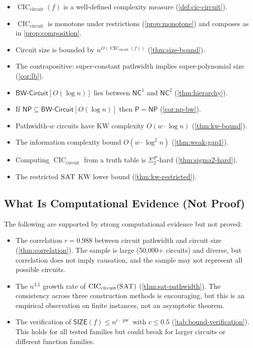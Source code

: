 \documentclass[11pt]{article}
\theoremstyle{plain}
\theoremstyle{definition}
\newcommand{\pw}{\operatorname{pw}}
\newcommand{\CIC}{\operatorname{CIC}}
\newcommand{\CICcirc}{\CIC_{\text{circuit}}}
\newcommand{\SAT}{\textsc{SAT}}
\newcommand{\SIZE}{\mathsf{SIZE}}
\newcommand{\Pclass}{\mathsf{P}}
\newcommand{\NP}{\mathsf{NP}}
\newcommand{\NC}{\mathsf{NC}}
\newcommand{\BWCircuit}{\mathsf{BW\text{-}Circuit}}
\begin{document}
\begin{itemize}
    \item $\CICcirc(f)$ is a well-defined complexity measure (\cref{def:cic-circuit}).
    \item $\CICcirc$ is monotone under restrictions (\cref{prop:monotone}) and composes as in \cref{prop:composition}.
    \item Circuit size is bounded by $n^{O(\CICcirc(f))}$ (\cref{thm:size-bound}).
    \item The contrapositive: super-constant pathwidth implies super-polynomial size (\cref{cor:lb}).
    \item $\BWCircuit[O(\log n)]$ lies between $\NC^1$ and $\NC^2$ (\cref{thm:hierarchy}).
    \item If $\NP \subseteq \BWCircuit[O(\log n)]$ then $\Pclass = \NP$ (\cref{cor:np-bw}).
    \item Pathwidth-$w$ circuits have KW complexity $O(w \cdot \log n)$ (\cref{thm:kw-bound}).
    \item The information complexity bound $O(w \cdot \log^2 n)$ (\cref{thm:weak-gap1}).
    \item Computing $\CICcirc$ from a truth table is $\Sigma_2^P$-hard (\cref{thm:sigma2-hard}).
    \item The restricted $\SAT$ KW lower bound (\cref{thm:kw-restricted}).
\end{itemize}

\subsection{What Is Computational Evidence (Not Proof)}

The following are supported by strong computational evidence but not proved:

\begin{itemize}
    \item The correlation $r = 0.988$ between circuit pathwidth and circuit size (\cref{thm:correlation}). The sample is large (50{,}000+ circuits) and diverse, but correlation does not imply causation, and the sample may not represent all possible circuits.
    \item The $n^{3.5}$ growth rate of $\CICcirc(\SAT)$ (\cref{thm:sat-pathwidth}). The consistency across three construction methods is encouraging, but this is an empirical observation on finite instances, not an asymptotic theorem.
    \item The verification of $\SIZE(f) \leq n^{c \cdot \pw}$ with $c \leq 0.5$ (\cref{tab:bound-verification}). This holds for all tested families but could break for larger circuits or different function families.
\end{itemize}
\end{document}
